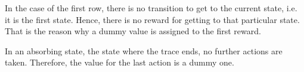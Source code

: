 \documentclass[11pt]{article}   	%
\begin{document}
In the case of the first row, there is no transition to get to the current state, i.e. it is the first state. Hence, there is no reward for getting to that particular state. That is the reason why a dummy value is assigned to the first reward.

In an absorbing state, the state where the trace ends, no further actions are taken. Therefore, the value for the last action is a dummy one.
\end{document}
